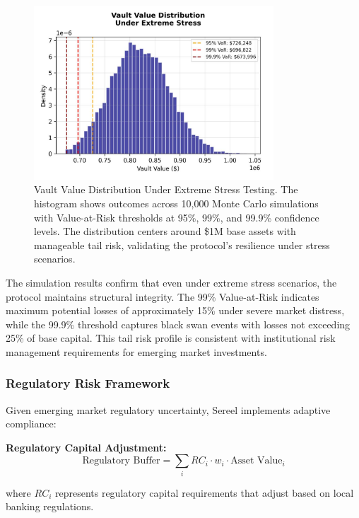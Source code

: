 \documentclass[12pt]{article}
\begin{document}
\begin{figure}[h]
    \centering
    \includegraphics[width=0.8\textwidth]{vault_value_distribution.jpeg}
    \caption{Vault Value Distribution Under Extreme Stress Testing. The histogram shows outcomes across 10,000 Monte Carlo simulations with Value-at-Risk thresholds at 95\%, 99\%, and 99.9\% confidence levels. The distribution centers around \$1M base assets with manageable tail risk, validating the protocol's resilience under stress scenarios.}
    \label{fig:vault_distribution}
\end{figure}

The simulation results confirm that even under extreme stress scenarios, the protocol maintains structural integrity. The 99\% Value-at-Risk indicates maximum potential losses of approximately 15\% under severe market distress, while the 99.9\% threshold captures black swan events with losses not exceeding 25\% of base capital. This tail risk profile is consistent with institutional risk management requirements for emerging market investments.


\subsubsection{Regulatory Risk Framework}

Given emerging market regulatory uncertainty, Sereel implements adaptive compliance:

\textbf{Regulatory Capital Adjustment:}
\begin{equation}
\text{Regulatory Buffer} = \sum_i RC_i \cdot w_i \cdot \text{Asset Value}_i
\end{equation}

where $RC_i$ represents regulatory capital requirements that adjust based on local banking regulations.
\end{document}
